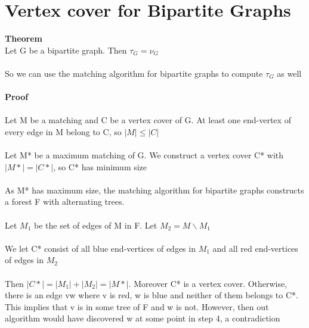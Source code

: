 \documentclass{article}[18pt]
\begin{document}
\section{Vertex cover for Bipartite Graphs}
\textbf{Theorem}\\
Let G be a bipartite graph. Then $\tau_G=\nu_G$\\
\\
So we can use the matching algorithm for bipartite graphs to compute $\tau_G$ as well\\
\\
\textbf{Proof}\\
\\
Let M be a matching and C be a vertex cover of G. At least one end-vertex of every edge in M belong to C, so $|M|\leqslant |C|$\\
\\
Let M* be a maximum matching of G. We construct a vertex cover C* with $|M*|=|C*|$, so C* has minimum size\\
\\
As M* has maximum size, the matching algorithm for bipartite graphs constructs a forest F with alternating trees.\\
\\
Let $M_1$ be the set of edges of M in F. Let $M_2=M \backslash M_1$\\
\\
We let C* consist of all blue end-vertices of edges in $M_1$ and all red end-vertices of edges in $M_2$\\
\\
Then $|C*|=|M_1|+|M_2|=|M*|$. Moreover C* is a vertex cover. Otherwise, there is an edge vw where v is red, w is blue and neither of them belongs to C*. This implies that v is in some tree of F and w is not. However, then out algorithm would have discovered w at some point in step 4, a contradiction
\end{document}
